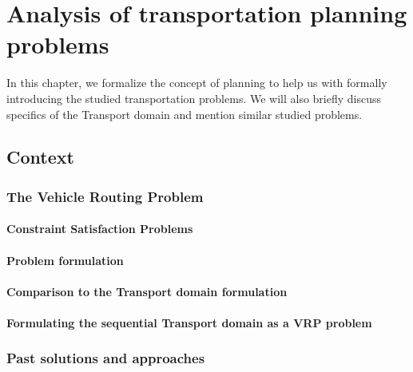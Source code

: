\chapter{Analysis of transportation planning problems}

In this chapter, we formalize the concept of planning to help us with formally introducing the studied transportation problems. We will also briefly discuss specifics of the Transport domain and mention similar studied problems.

\section{Context}



\subsection{The Vehicle Routing Problem}

 \citep{Dantzig1959}

 \citep{Braekers2016}

 \citep{Montoya-Torres2015}

 \citep{ResearchGroup2013}

\subsubsection{Constraint Satisfaction Problems}

\subsubsection{Problem formulation}

\subsubsection{Comparison to the Transport domain formulation}

\subsubsection{Formulating the sequential Transport domain as a VRP problem}


\subsection{Past solutions and approaches}

